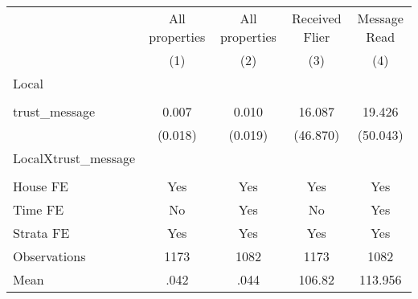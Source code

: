 {
\def\sym#1{\ifmmode^{#1}\else\(^{#1}\)\fi}
\begin{tabular}{l*{4}{c}}
\hline\hline
                &\multicolumn{1}{c}{All properties}&\multicolumn{1}{c}{All properties}&\multicolumn{1}{c}{Received Flier}&\multicolumn{1}{c}{Message Read}\\
                &\multicolumn{1}{c}{(1)}         &\multicolumn{1}{c}{(2)}         &\multicolumn{1}{c}{(3)}         &\multicolumn{1}{c}{(4)}         \\
\hline
Local           &                  &                  &                  &                  \\
                &                  &                  &                  &                  \\
trust\_message   &    0.007         &    0.010         &   16.087         &   19.426         \\
                &  (0.018)         &  (0.019)         & (46.870)         & (50.043)         \\
LocalXtrust\_message&                  &                  &                  &                  \\
                &                  &                  &                  &                  \\
House FE        &      Yes         &      Yes         &      Yes         &      Yes         \\
Time FE         &       No         &      Yes         &       No         &      Yes         \\
Strata FE       &      Yes         &      Yes         &      Yes         &      Yes         \\
\hline
Observations    &     1173         &     1082         &     1173         &     1082         \\
Mean            &     .042         &     .044         &   106.82         &  113.956         \\
\hline\hline
\end{tabular}
}
